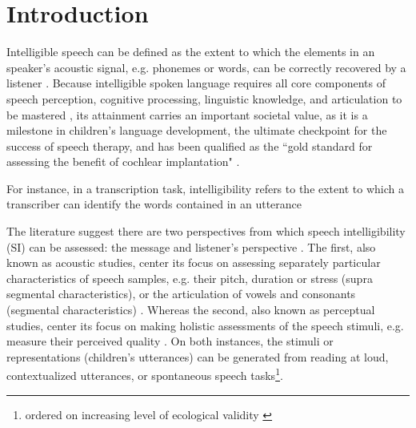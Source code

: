 \section{Introduction}

Intelligible speech can be defined as the extent to which the elements in an speaker's acoustic signal, e.g. phonemes or words, can be correctly recovered by a listener \citep{Kent_et_al_1989, Whitehill_et_al_2004, vanHeuven_2008, Freeman_et_al_2017}. Because intelligible spoken language requires all core components of speech perception, cognitive processing, linguistic knowledge, and articulation to be mastered \citep{Freeman_et_al_2017}, its attainment carries an important societal value, as it is a milestone in children's language development, the ultimate checkpoint for the success of speech therapy, and has been qualified as the ``gold standard for assessing the benefit of cochlear implantation" \citep{Chin_et_al_2012}. 

For instance, in a transcription task, intelligibility refers to the extent to which a transcriber can identify the words contained in an utterance

The literature suggest there are two perspectives from which speech intelligibility (SI) can be assessed: the message and listener's perspective \citep{Boonen_et_al_2020, Boonen_et_al_2021}. The first, also known as acoustic studies, center its focus on assessing separately particular characteristics of speech samples, e.g. their pitch, duration or stress (supra segmental characteristics), or the articulation of vowels and consonants (segmental characteristics) \citep{Rowe_et_al_2018}. Whereas the second, also known as perceptual studies, center its focus on making holistic assessments of the speech stimuli, e.g. measure their perceived quality \citep{Boonen_et_al_2020, Boonen_et_al_2021}. On both instances, the stimuli or representations (children's utterances) can be generated from reading at loud, contextualized utterances, or spontaneous speech tasks\footnote{ordered on increasing level of ecological validity \citep{Flipsen_2006,Ertmer_2011}}.

\begin{comment}
	Based on their description, it seems that that perceptual studies are more subjective than acoustic studies, as they do not rely on "objective" measurements, i.e. time duration, wave amplitude, among others, available in the former. However, for the case of SI, there are objective and subjective assessment methodologies.
\end{comment}

